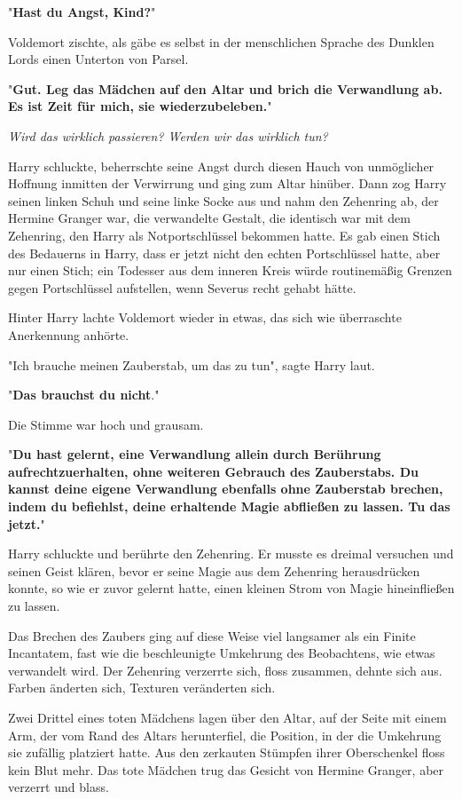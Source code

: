 {"\textbf{Hast du Angst, Kind?}"

Voldemort zischte, als gäbe es selbst in der menschlichen Sprache des Dunklen Lords einen Unterton von Parsel.

"\textbf{Gut. Leg das Mädchen auf den Altar und brich die Verwandlung ab. Es ist Zeit für mich, sie wiederzubeleben.}"

\emph{Wird das wirklich passieren? Werden wir das wirklich tun?}

Harry schluckte, beherrschte seine Angst durch diesen Hauch von unmöglicher Hoffnung inmitten der Verwirrung und ging zum Altar hinüber. Dann zog Harry seinen linken Schuh und seine linke Socke aus und nahm den Zehenring ab, der Hermine Granger war, die verwandelte Gestalt, die identisch war mit dem Zehenring, den Harry als Notportschlüssel bekommen hatte. Es gab einen Stich des Bedauerns in Harry, dass er jetzt nicht den echten Portschlüssel hatte, aber nur einen Stich; ein Todesser aus dem inneren Kreis würde routinemäßig Grenzen gegen Portschlüssel aufstellen, wenn Severus recht gehabt hätte.

Hinter Harry lachte Voldemort wieder in etwas, das sich wie überraschte Anerkennung anhörte.

"Ich brauche meinen Zauberstab, um das zu tun", sagte Harry laut.

"\textbf{Das brauchst du nicht}."

Die Stimme war hoch und grausam.

"\textbf{Du hast gelernt, eine Verwandlung allein durch Berührung aufrechtzuerhalten, ohne weiteren Gebrauch des Zauberstabs. Du kannst deine eigene Verwandlung ebenfalls ohne Zauberstab brechen, indem du befiehlst, deine erhaltende Magie abfließen zu lassen. Tu das jetzt.}"

Harry schluckte und berührte den Zehenring. Er musste es dreimal versuchen und seinen Geist klären, bevor er seine Magie aus dem Zehenring herausdrücken konnte, so wie er zuvor gelernt hatte, einen kleinen Strom von Magie hineinfließen zu lassen.

Das Brechen des Zaubers ging auf diese Weise viel langsamer als ein Finite Incantatem, fast wie die beschleunigte Umkehrung des Beobachtens, wie etwas verwandelt wird. Der Zehenring verzerrte sich, floss zusammen, dehnte sich aus. Farben änderten sich, Texturen veränderten sich.

Zwei Drittel eines toten Mädchens lagen über den Altar, auf der Seite mit einem Arm, der vom Rand des Altars herunterfiel, die Position, in der die Umkehrung sie zufällig platziert hatte. Aus den zerkauten Stümpfen ihrer Oberschenkel floss kein Blut mehr. Das tote Mädchen trug das Gesicht von Hermine Granger, aber verzerrt und blass.

}
